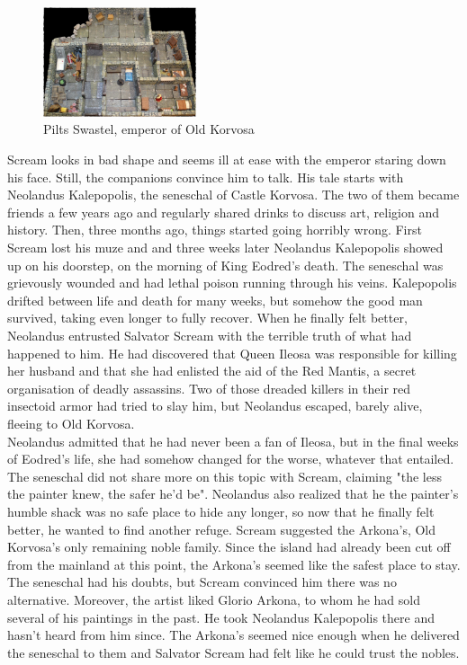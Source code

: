 \begin{figure}[h]
	\centering
	\includegraphics[width=0.4\textwidth]{images/Pilts-Swastel-emperor-of-Old-Korvosa-562541723_mod.jpg}
	\caption{Pilts Swastel, emperor of Old Korvosa}
	\label{fig:Pilts-Swastel-emperor-of-Old-Korvosa-562541723}
\end{figure}

Scream looks in bad shape and seems ill at ease with the emperor staring down his face. Still, the companions convince him to talk. His tale starts with Neolandus Kalepopolis, the seneschal of Castle Korvosa. The two of them became friends a few years ago and regularly shared drinks to discuss art, religion and history. Then, three months ago, things started going horribly wrong. First Scream lost his muze and and three weeks later Neolandus Kalepopolis showed up on his doorstep, on the morning of King Eodred's death. The seneschal was grievously wounded and had lethal poison running through his veins. Kalepopolis drifted between life and death for many weeks, but somehow the good man survived, taking even longer to fully recover. When he finally felt better, Neolandus entrusted Salvator Scream with the terrible truth of what had happened to him. He had discovered that Queen Ileosa was responsible for killing her husband and that she had enlisted the aid of the Red Mantis, a secret organisation of deadly assassins. Two of those dreaded killers in their red insectoid armor had tried to slay him, but Neolandus escaped, barely alive, fleeing to Old Korvosa.\\

Neolandus admitted that he had never been a fan of Ileosa, but in the final weeks of Eodred's life, she had somehow changed for the worse, whatever that entailed. The seneschal did not share more on this topic with Scream, claiming "the less the painter knew, the safer he'd be". Neolandus also realized that he the painter's humble shack was no safe place to hide any longer, so now that he finally felt better, he wanted to find another refuge. Scream suggested the Arkona's, Old Korvosa's only remaining noble family. Since the island had already been cut off from the mainland at this point, the Arkona's seemed like the safest place to stay. The seneschal had his doubts, but Scream convinced him there was no alternative. Moreover, the artist liked Glorio Arkona, to whom he had sold several of his paintings in the past. He took Neolandus Kalepopolis there and hasn't heard from him since. The Arkona's seemed nice enough when he delivered the seneschal to them and Salvator Scream had felt like he could trust the nobles.\\

